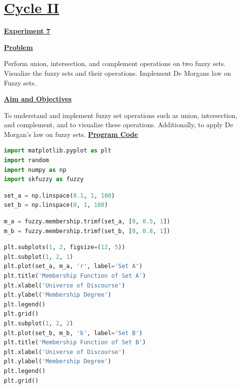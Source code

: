 \documentclass[a4paper,12pt]{article}
\begin{document}
\newpage

\section*{\underline{Cycle II}}
\begin{center}
\textbf{\underline{Experiment 7}}
\label{exp7}
\end{center}

\vspace{1em}
\noindent
\textbf{\underline{Problem}}\par
\noindent
Perform union, intersection, and complement operations on two fuzzy sets. Visualize the fuzzy sets and their operations. Implement De Morgans law on Fuzzy sets.


\vspace{1em}
\noindent
\textbf{\underline{Aim and Objectives}}\par
\noindent
To understand and implement fuzzy set operations such as union, intersection, and complement, and to visualize these operations. Additionally, to apply De Morgan's law on fuzzy sets.
\vspace{1em}
\noindent
\textbf{\underline{Program Code}}
\noindent
\begin{lstlisting}[language=Python]
import matplotlib.pyplot as plt
import random
import numpy as np
import skfuzzy as fuzzy
\end{lstlisting}

\begin{lstlisting}[language=Python]
set_a = np.linspace(0.1, 1, 100)
set_b = np.linspace(0, 1, 100)
\end{lstlisting}

\begin{lstlisting}[language=Python]
m_a = fuzzy.membership.trimf(set_a, [0, 0.5, 1])
m_b = fuzzy.membership.trimf(set_b, [0, 0.8, 1])
\end{lstlisting}

\begin{lstlisting}[language=Python]
plt.subplots(1, 2, figsize=(12, 5))
plt.subplot(1, 2, 1)
plt.plot(set_a, m_a, 'r', label='Set A')
plt.title('Membership Function of Set A')
plt.xlabel('Universe of Discourse')
plt.ylabel('Membership Degree')
plt.legend()
plt.grid()
plt.subplot(1, 2, 2)
plt.plot(set_b, m_b, 'b', label='Set B')
plt.title('Membership Function of Set B')
plt.xlabel('Universe of Discourse')
plt.ylabel('Membership Degree')
plt.legend()
plt.grid()
\end{lstlisting}
\end{document}
